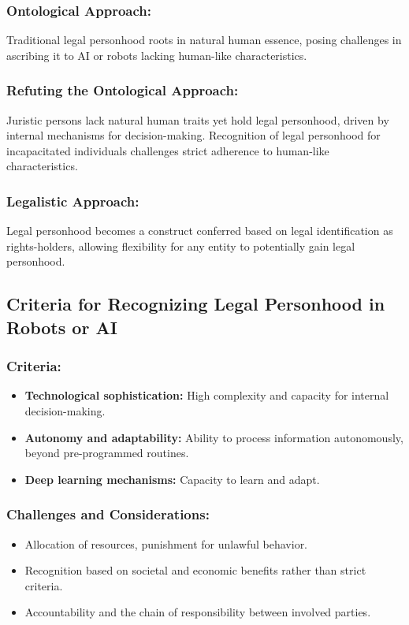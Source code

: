 \subsubsection{Ontological Approach:}
Traditional legal personhood roots in natural human essence, posing challenges in ascribing it to AI or robots lacking human-like characteristics.

\subsubsection{Refuting the Ontological Approach:}
Juristic persons lack natural human traits yet hold legal personhood, driven by internal mechanisms for decision-making. Recognition of legal personhood for incapacitated individuals challenges strict adherence to human-like characteristics.

\subsubsection{Legalistic Approach:}
Legal personhood becomes a construct conferred based on legal identification as rights-holders, allowing flexibility for any entity to potentially gain legal personhood.

\subsection*{Criteria for Recognizing Legal Personhood in Robots or AI}

\subsubsection{Criteria:}
\begin{itemize}[label=-]
    \item \textbf{Technological sophistication:} High complexity and capacity for internal decision-making.
    \item \textbf{Autonomy and adaptability:} Ability to process information autonomously, beyond pre-programmed routines.
    \item \textbf{Deep learning mechanisms:} Capacity to learn and adapt.
\end{itemize}

\subsubsection{Challenges and Considerations:}
\begin{itemize}[label=-]
    \item Allocation of resources, punishment for unlawful behavior.
    \item Recognition based on societal and economic benefits rather than strict criteria.
    \item Accountability and the chain of responsibility between involved parties.
\end{itemize}

